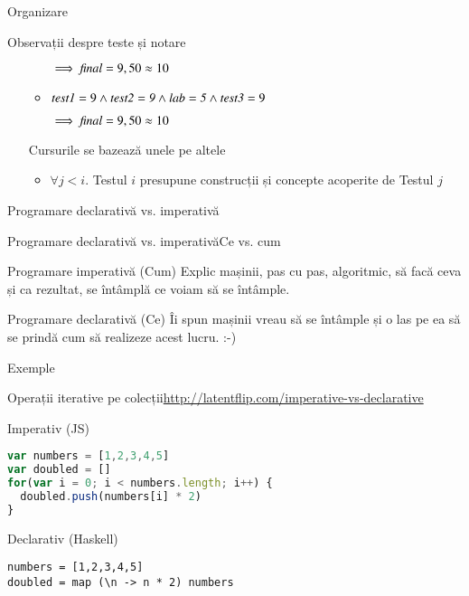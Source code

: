 \documentclass[xcolor=pdftex,romanian,colorlinks]{beamer}
\begin{document}
\begin{section}{Organizare}
\begin{frame}{Observații despre teste și notare}
\begin{itemize}
\begin{itemize}
\hfill $ \implies {\it final} = 9,50\approx 10$
\item ${\it test1} = 9 \wedge {\it test2 =  9} \wedge {\it lab =  5} \wedge {\it test3} = 9$

\hfill $ \implies {\it final} = 9,50\approx 10$
\end{itemize}
\vitem Cursurile se bazează unele pe altele
\begin{itemize}
\item $\forall j < i . $ Testul $i$ presupune construcții și concepte acoperite de Testul $j$
\end{itemize}
\end{itemize}
\end{frame}


\end{section}

\begin{section}{Programare declarativă vs. imperativă}
\begin{frame}{Programare declarativă vs. imperativă}{Ce vs. cum}
\begin{block}{Programare imperativă (Cum)}
Explic mașinii, pas cu pas, algoritmic,  să facă ceva și ca rezultat, se întâmplă \alert{ce} voiam să se întâmple.
\end{block}
\vfill\begin{block}{Programare declarativă (Ce)}
Îi spun mașinii  vreau să se întâmple și o las pe ea să se prindă \alert{cum} să realizeze acest lucru. :-)
\end{block}
\end{frame}

\begin{subsection}{Exemple}
\begin{frame}[fragile]{Operații iterative pe colecții}{\url{http://latentflip.com/imperative-vs-declarative}}
\begin{block}{Imperativ (JS)}
{\small
\begin{lstlisting}[language=JavaScript]
var numbers = [1,2,3,4,5]
var doubled = []
for(var i = 0; i < numbers.length; i++) {
  doubled.push(numbers[i] * 2)
}
\end{lstlisting}}
\end{block}

\begin{block}{Declarativ (Haskell)}
{\small
\begin{lstlisting}
numbers = [1,2,3,4,5]
doubled = map (\n -> n * 2) numbers
\end{lstlisting}}
\end{block}
\end{frame}


\end{subsection}
\end{section}
\end{document}
